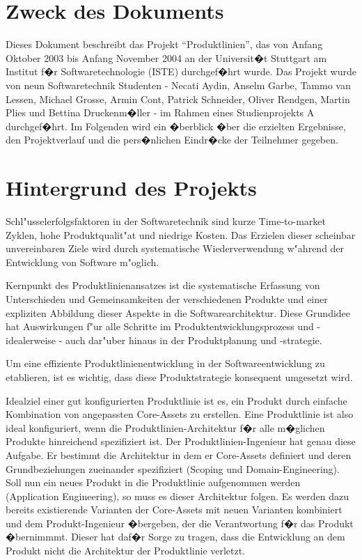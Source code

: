 \documentclass[a4paper,titlepage,12pt,ngerman]{scrbook}
\begin{document}
\section{Zweck des Dokuments}

Dieses Dokument beschreibt das Projekt ``Produktlinien'', das von Anfang Oktober
 2003 bis Anfang November 2004 an der
Universit�t Stuttgart am Institut f�r Softwaretechnologie (ISTE) durchgef�hrt
wurde. Das Projekt wurde von neun Softwaretechnik Studenten - Necati
Aydin, Anselm Garbe, Tammo van Lessen, Michael Grosse, Armin Cont, Patrick Schneider,
Oliver Rendgen, Martin Plies und Bettina Druckenm�ller - im Rahmen eines Studienprojekts A
durchgef�hrt. Im Folgenden wird ein �berblick �ber die erzielten
Ergebnisse, den Projektverlauf und die pers�nlichen Eindr�cke der
Teilnehmer gegeben.

\section{Hintergrund des Projekts}

Schl"usselerfolgsfaktoren in der Softwaretechnik sind kurze
Time-to-market Zyklen, hohe Produktqualit"at und niedrige Kosten. Das Erzielen
dieser scheinbar unvereinbaren Ziele wird durch systematische
Wiederverwendung w"ahrend der Entwicklung von Software m"oglich.\par

Kernpunkt des Produktlinienansatzes ist die systematische Erfassung
von Unterschieden und Gemeinsamkeiten der verschiedenen Produkte und
einer expliziten Abbildung dieser Aspekte in die
Softwarearchitektur. Diese Grundidee hat Auswirkungen f"ur alle
Schritte im Produktentwicklungsprozess und - idealerweise - auch
dar"uber hinaus in der Produktplanung und -strategie.\par

Um eine effiziente Produktlinienentwicklung in der Softwareentwicklung
zu etablieren, ist es wichtig, dass diese Produktstrategie konsequent
umgesetzt wird.\par

Idealziel einer gut konfigurierten Produktlinie ist es, ein Produkt
durch einfache Kombination von angepassten Core-Assets zu
erstellen. Eine Produktlinie ist also ideal konfiguriert, wenn die
Produktlinien-Architektur f�r alle m�glichen Produkte hinreichend
spezifiziert ist. Der Produkt\-linien-Ingenieur hat genau
diese Aufgabe. Er bestimmt die Architektur in dem er Core-Assets
definiert und deren Grundbeziehungen zueinander spezifiziert (Scoping
und Domain-Engineering). Soll nun ein neues Produkt in die
Produktlinie aufgenommen werden (Application Engineering), so muss es
dieser Architektur folgen. Es werden dazu bereits existierende
Varianten der Core-Assets mit neuen Varianten kombiniert und dem
Produkt-Ingenieur �bergeben, der die Verantwortung f�r das Produkt
�bernimmmt. Dieser hat daf�r Sorge zu tragen, dass die Entwicklung an
dem Produkt nicht die Architektur der Produktlinie verletzt.\par 
\end{document}

